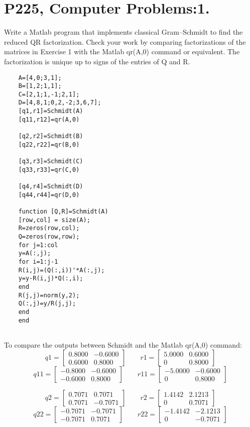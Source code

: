 \documentclass[UTF8]{ctexart}
\begin{document}
\section{P225, Computer Problems:1.}
Write a Matlab program that implements classical Gram–Schmidt to find the reduced QR
factorization. Check your work by comparing factorizations of the matrices in Exercise 1 with
the Matlab qr(A,0) command or equivalent. The factorization is unique up to signs of the
entries of Q and R.
   \begin{centering}
   	\begin{lstlisting}
   	A=[4,0;3,1];
   	B=[1,2;1,1];
   	C=[2,1;1,-1;2,1];
   	D=[4,8,1;0,2,-2;3,6,7];
   	[q1,r1]=Schmidt(A)
   	[q11,r12]=qr(A,0)
   	
   	[q2,r2]=Schmidt(B)
   	[q22,r22]=qr(B,0)
   	
   	[q3,r3]=Schmidt(C)
   	[q33,r33]=qr(C,0)
   	
   	[q4,r4]=Schmidt(D)
   	[q44,r44]=qr(D,0)
   	
   	function [Q,R]=Schmidt(A)
   	[row,col] = size(A);  
   	R=zeros(row,col);
   	Q=zeros(row,row);
   	for j=1:col
   	y=A(:,j);
   	for i=1:j-1
   	R(i,j)=(Q(:,i))'*A(:,j);
   	y=y-R(i,j)*Q(:,i);
   	end
   	R(j,j)=norm(y,2);
   	Q(:,j)=y/R(j,j);
   	end
   	end
   	
   	\end{lstlisting}   \end{centering}
To compare the outputs between Schmidt and the Matlab qr(A,0) command:
$$q1=\begin{bmatrix}
	
	0.8000 &  -0.6000\\
	0.6000 &  0.8000
\end{bmatrix}\qquad
r1= \begin{bmatrix}
 5.0000  &  0.6000\\
     0   & 0.8000
\end{bmatrix} $$
$$q11 =\begin{bmatrix}
-0.8000  & -0.6000\\
-0.6000  &  0.8000
\end{bmatrix}\qquad
r11=\begin{bmatrix}	
  -5.0000 &  -0.6000\\
0  &  0.8000
\end{bmatrix}$$

$$q2=\begin{bmatrix}

0.7071  &  0.7071\\
0.7071  & -0.7071
\end{bmatrix}\qquad
r2= \begin{bmatrix}
 1.4142  &  2.1213\\
0   & 0.7071
\end{bmatrix} $$
$$q22 =\begin{bmatrix}
-0.7071  & -0.7071\\
-0.7071   & 0.7071

\end{bmatrix}\qquad
r22=\begin{bmatrix}	
-1.4142 &  -2.1213\\
0   &-0.7071
\end{bmatrix}$$    
   
\end{document}
